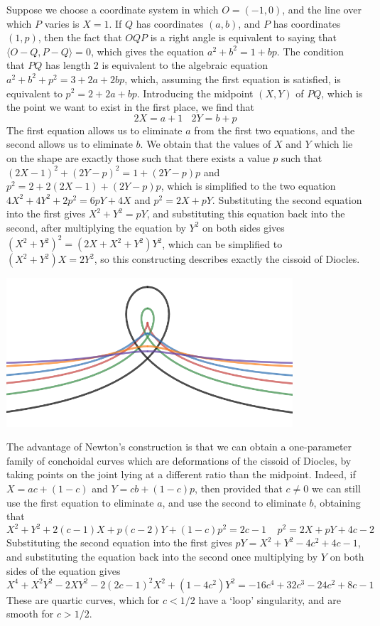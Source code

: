 \begin{example}
    Suppose we choose a coordinate system in which $O = (-1,0)$, and the line over which $P$ varies is $X = 1$. If $Q$ has coordinates $(a,b)$, and $P$ has coordinates $(1,p)$, then the fact that $OQP$ is a right angle is equivalent to saying that $\langle O - Q, P - Q \rangle = 0$, which gives the equation $a^2 + b^2 = 1 + bp$. The condition that $PQ$ has length 2 is equivalent to the algebraic equation $a^2 + b^2 + p^2 = 3 + 2a + 2bp$, which, assuming the first equation is satisfied, is equivalent to $p^2 = 2 + 2a + bp$. Introducing the midpoint $(X,Y)$ of $PQ$, which is the point we want to exist in the first place, we find that
    \[ 2X = a + 1\ \ \ \ 2Y = b + p \]
    The first equation allows us to eliminate $a$ from the first two equations, and the second allows us to eliminate $b$. We obtain that the values of $X$ and $Y$ which lie on the shape are exactly those such that there exists a value $p$ such that $(2X - 1)^2 + (2Y - p)^2 = 1 + (2Y - p)p$ and $p^2 = 2 + 2(2X - 1) + (2Y - p)p$, which is simplified to the two equation $4X^2 + 4Y^2 + 2p^2 = 6pY + 4X$ and $p^2 = 2X + pY$. Substituting the second equation into the first gives $X^2 + Y^2 = pY$, and substituting this equation back into the second, after multiplying the equation by $Y^2$ on both sides gives $(X^2 + Y^2)^2 = (2X + X^2 + Y^2)Y^2$, which can be simplified to $(X^2 + Y^2)X = 2Y^2$, so this constructing describes exactly the cissoid of Diocles.

    \begin{center}
        \includegraphics[width=0.8\textwidth]{algebraicGeometryConchoidDiocles2}
    \end{center}

    The advantage of Newton's construction is that we can obtain a one-parameter family of conchoidal curves which are deformations of the cissoid of Diocles, by taking points on the joint lying at a different ratio than the midpoint. Indeed, if $X = ac + (1 - c)$ and $Y = cb + (1-c)p$, then provided that $c \neq 0$ we can still use the first equation to eliminate $a$, and use the second to  eliminate $b$, obtaining that
    \[ X^2 + Y^2 + 2(c-1)X + p(c-2)Y + (1 - c)p^2 = 2c - 1\ \ \ \ \  p^2 = 2X + pY + 4c - 2 \]
    Substituting the second equation into the first gives $pY = X^2 + Y^2 - 4c^2 + 4c - 1$, and substituting the equation back into the second once multiplying by $Y$ on both sides of the equation gives
    \[ X^4 + X^2Y^2  - 2XY^2 - 2(2c-1)^2X^2 + (1 - 4c^2)Y^2 = -16c^4 + 32c^3 - 24c^2 + 8c - 1 \]
    These are quartic curves, which for $c < 1/2$ have a `loop' singularity, and are smooth for $c > 1/2$.
\end{example}

